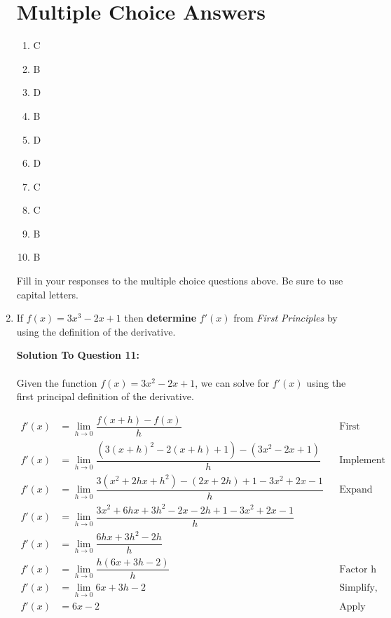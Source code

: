 \documentclass[12pt]{book}
\begin{document}
\begin{enumerate}
\newpage

\section*{Multiple Choice Answers}

\begin{enumerate}[label={\arabic*.}]
\item C
\item B
\item D
\item B
\item D
\item D
\item C
\item C
\item B
\item B
\end{enumerate}

Fill in your responses to the multiple choice questions above. Be sure to use capital letters.

\newpage

\item If $f(x) = 3x^3 - 2x + 1$ then \textbf{determine} $f'(x)$ from \emph{First Principles} by using the definition of the derivative.


\vspace{0.3cm} 
\textbf{Solution To Question 11:}\\
\\
Given the function $f(x) = 3x^2-2x+1$, we can solve for $f'(x)$ using the first principal 
definition of the derivative.

\addtolength{\jot}{1em}
\begin{align*}
    f'(x) &= \lim_{h \to 0} \dfrac{f(x+h)-f(x)}{h} && \text{First Principle Definition} \\
    f'(x) &= \lim_{h \to 0} \dfrac{(3(x+h)^2 - 2(x+h) + 1) - (3x^2-2x+1)}{h} && \text{Implement f(x) with x+h and x} \\
    f'(x) &= \lim_{h \to 0} \dfrac{3(x^2+2hx+h^2) - (2x+2h) + 1 - 3x^2+2x-1}{h} && \text{Expand and Simplify} \\
    f'(x) &= \lim_{h \to 0} \dfrac{3x^2+6hx+3h^2 - 2x-2h + 1 - 3x^2+2x-1}{h} \\
    f'(x) &= \lim_{h \to 0} \dfrac{6hx+3h^2-2h}{h} \\
    f'(x) &= \lim_{h \to 0} \dfrac{h(6x+3h-2)}{h} && \text{Factor h} \\
    f'(x) &= \lim_{h \to 0} 6x+3h-2 && \text{Simplify, Cross out h} \\
    f'(x) &= 6x-2 && \text{Apply Limit} \\
\end{align*}


\end{enumerate}
\end{document}
